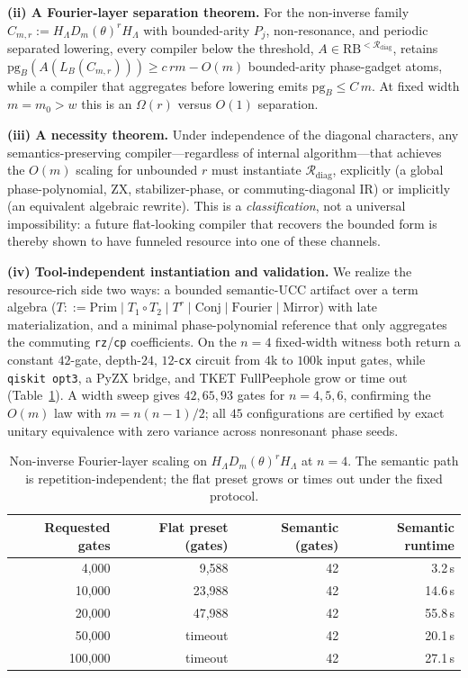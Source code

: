 \documentclass[11pt]{article}
\begin{document}
\noindent\textbf{(ii) A Fourier-layer separation theorem.} For the non-inverse family
$C_{m,r}:=H_\Lambda D_m(\theta)^{r}H_\Lambda$ with bounded-arity $P_j$, non-resonance, and periodic
separated lowering, every compiler below the threshold,
$A\in\mathrm{RB}^{<\mathcal{R}_{\mathrm{diag}}}$, retains
$\mathrm{pg}_B(A(L_B(C_{m,r})))\ge c\,rm-O(m)$ bounded-arity phase-gadget atoms, while a compiler that
aggregates before lowering emits $\mathrm{pg}_B\le C\,m$. At fixed width $m=m_0>w$ this is an
$\Omega(r)$ versus $O(1)$ separation.

\noindent\textbf{(iii) A necessity theorem.} Under independence of the diagonal characters, any
semantics-preserving compiler---regardless of internal algorithm---that achieves the $O(m)$ scaling
for unbounded $r$ must instantiate $\mathcal{R}_{\mathrm{diag}}$, explicitly (a global
phase-polynomial, ZX, stabilizer-phase, or commuting-diagonal IR) or implicitly (an equivalent
algebraic rewrite). This is a \emph{classification}, not a universal impossibility: a future
flat-looking compiler that recovers the bounded form is thereby shown to have funneled resource into
one of these channels.

\noindent\textbf{(iv) Tool-independent instantiation and validation.} We realize the resource-rich
side two ways: a bounded semantic-UCC artifact over a term algebra
($T ::= \mathrm{Prim}\mid T_1\!\circ\!T_2\mid T^r\mid \mathrm{Conj}\mid \mathrm{Fourier}\mid
\mathrm{Mirror}$) with late materialization, and a minimal phase-polynomial reference that only
aggregates the commuting \texttt{rz}/\texttt{cp} coefficients. On the $n=4$ fixed-width witness both
return a constant $42$-gate, depth-$24$, $12$-\texttt{cx} circuit from $4$k to $100$k input gates,
while \texttt{qiskit opt3}, a PyZX bridge, and TKET FullPeephole grow or time out
(Table~\ref{tab:headline}). A width sweep gives $42,65,93$ gates for $n=4,5,6$, confirming the
$O(m)$ law with $m=n(n-1)/2$; all $45$ configurations are certified by exact unitary equivalence
with zero variance across nonresonant phase seeds.

\begin{table}[ht]
\centering
\small
\begin{tabular}{rrrr}
\toprule
Requested gates & Flat preset (gates) & Semantic (gates) & Semantic runtime \\
\midrule
4{,}000   & 9{,}588  & 42 & 3.2\,s \\
10{,}000  & 23{,}988 & 42 & 14.6\,s \\
20{,}000  & 47{,}988 & 42 & 55.8\,s \\
50{,}000  & timeout  & 42 & 20.1\,s \\
100{,}000 & timeout  & 42 & 27.1\,s \\
\bottomrule
\end{tabular}
\caption{Non-inverse Fourier-layer scaling on $H_\Lambda D_m(\theta)^r H_\Lambda$ at $n=4$. The
semantic path is repetition-independent; the flat preset grows or times out under the fixed protocol.}
\label{tab:headline}
\end{table}
\end{document}
